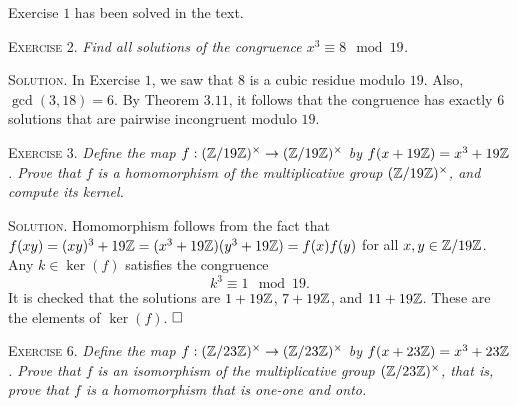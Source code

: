 \documentclass[11pt, leqno]{article}
\newcommand{\done}{\ensuremath{\hfill\square}}
\begin{document}
%


Exercise $1$ has been solved in the text.

\textsc{Exercise 2}. \emph{Find all solutions of the congruence $x^3\equiv 8 \mod 19$.}

\textsc{Solution}. In Exercise $1$, we saw that $8$ is a cubic residue modulo $19$. Also, $\gcd(3,18) = 6$. By Theorem $3.11$, it follows that the congruence has exactly $6$ solutions that are pairwise incongruent modulo $19$.

\textsc{Exercise 3}. \emph{Define the map $f:(\mathbb{Z}/19\mathbb{Z})^{\times} \to (\mathbb{Z}/19\mathbb{Z})^{\times}$ by $f(x+19\mathbb{Z}) = x^3+19\mathbb{Z}$. Prove that $f$ is a homomorphism of the multiplicative group $(\mathbb{Z}/19\mathbb{Z})^{\times}$, and compute its kernel.}

\textsc{Solution}. Homomorphism follows from the fact that $f(xy) = (xy)^3 + 19\mathbb{Z} = (x^3+19\mathbb{Z})(y^3+19\mathbb{Z}) = f(x)f(y)$ for all $x,y \in \mathbb{Z}/19\mathbb{Z}$. Any $k\in \ker(f)$ satisfies the congruence
\begin{displaymath}
k^3 \equiv 1 \mod 19.
\end{displaymath}
It is checked that the solutions are $1+19\mathbb{Z}$, $7+19\mathbb{Z}$, and $11+19\mathbb{Z}$. These are the elements of $\ker(f)$. \done

\textsc{Exercise 6}. \emph{Define the map $f: (\mathbb{Z}/23\mathbb{Z})^{\times} \to (\mathbb{Z}/23\mathbb{Z})^{\times}$ by $f(x+ 23\mathbb{Z}) = x^3 + 23\mathbb{Z}$. Prove that $f$ is an isomorphism of the multiplicative group $(\mathbb{Z}/23\mathbb{Z})^{\times}$, that is, prove that $f$ is a homomorphism that is one-one and onto.}
\end{document}
